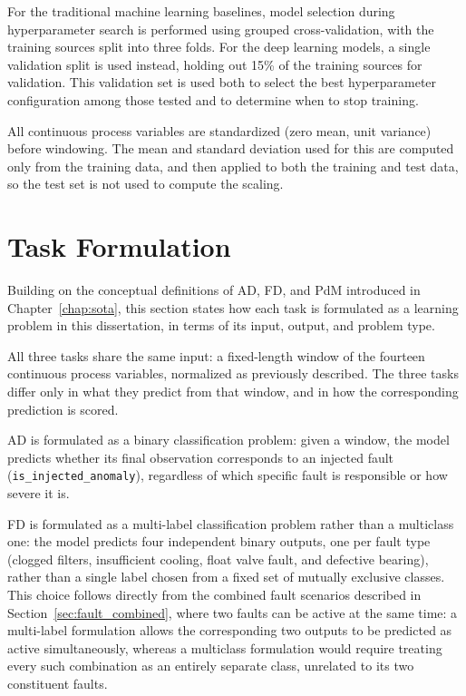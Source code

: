 For the traditional machine learning baselines, model selection during 
hyperparameter search is performed using grouped cross-validation, with the training sources split into 
three folds. For the deep learning models, a 
single validation split is used instead, holding out 15\% of the training sources for validation. This 
validation set is used both to select the best hyperparameter configuration among those tested and to 
determine when to stop training.

All continuous process variables are standardized (zero mean, unit variance) before windowing. The 
mean and standard deviation used for this are computed only from the training data, and then applied 
to both the training and test data, so the test set is not used to compute the scaling.

\section{Task Formulation} \label{sec:task_formulation}

Building on the conceptual definitions of AD, FD, and PdM introduced in Chapter~\ref{chap:sota}, 
this section states how each task is formulated as a learning 
problem in this dissertation, in terms of its input, output, and problem type.

All three tasks share the same input: a fixed-length window of the fourteen continuous process variables, normalized as 
previously described. The three tasks 
differ only in what they predict from that window, and in how the corresponding prediction is scored.

AD is formulated as a binary classification problem: given a window, the model predicts 
whether its final observation corresponds to an injected fault (\texttt{is\_injected\_anomaly}), 
regardless of which specific fault is responsible or how severe it is.

FD is formulated as a multi-label classification problem rather than a multiclass one: the 
model predicts four independent binary outputs, one per fault type (clogged filters, insufficient 
cooling, float valve fault, and defective bearing), rather than a single label chosen from a fixed set of 
mutually exclusive classes. This choice follows directly from the combined fault scenarios described in 
Section~\ref{sec:fault_combined}, where two faults can be active at the same time: a multi-label 
formulation allows the corresponding two outputs to be predicted as active simultaneously, whereas a 
multiclass formulation would require treating every such combination as an entirely separate class, 
unrelated to its two constituent faults.

